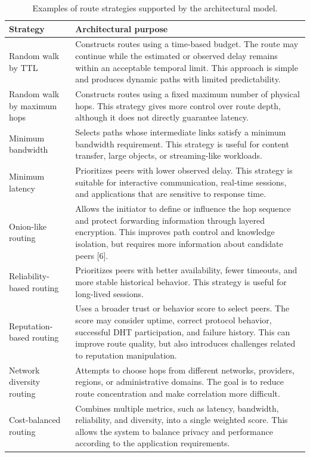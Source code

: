 \documentclass[12pt,a4paper]{article}
\begin{document}
\begin{table}[H]
\centering
\caption{Examples of route strategies supported by the architectural model.}
\label{tab:route-strategy-abstraction}
\small
\begin{tabular}{L{0.25\textwidth} L{0.65\textwidth}}
\toprule
\textbf{Strategy} & \textbf{Architectural purpose} \\
\midrule

Random walk by TTL &
Constructs routes using a time-based budget. The route may continue while the
estimated or observed delay remains within an acceptable temporal limit. This approach
is simple and produces dynamic paths with limited predictability. \\

Random walk by maximum hops &
Constructs routes using a fixed maximum number of physical hops. This strategy gives
more control over route depth, although it does not directly guarantee latency. \\

Minimum bandwidth &
Selects paths whose intermediate links satisfy a minimum bandwidth requirement. This
strategy is useful for content transfer, large objects, or streaming-like workloads. \\

Minimum latency &
Prioritizes peers with lower observed delay. This strategy is suitable for interactive
communication, real-time sessions, and applications that are sensitive to response
time. \\

Onion-like routing &
Allows the initiator to define or influence the hop sequence and protect forwarding
information through layered encryption. This improves path control and knowledge
isolation, but requires more information about candidate peers [6]. \\

Reliability-based routing &
Prioritizes peers with better availability, fewer timeouts, and more stable historical
behavior. This strategy is useful for long-lived sessions. \\

Reputation-based routing &
Uses a broader trust or behavior score to select peers. The score may consider uptime,
correct protocol behavior, successful DHT participation, and failure history. This can
improve route quality, but also introduces challenges related to reputation
manipulation. \\

Network diversity routing &
Attempts to choose hops from different networks, providers, regions, or administrative
domains. The goal is to reduce route concentration and make correlation more
difficult. \\

Cost-balanced routing &
Combines multiple metrics, such as latency, bandwidth, reliability, and diversity, into
a single weighted score. This allows the system to balance privacy and performance
according to the application requirements. \\

\bottomrule
\end{tabular}
\end{table}
\end{document}
